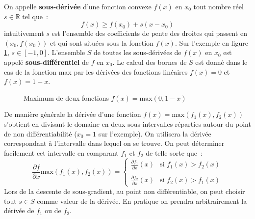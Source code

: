 \documentclass[11pt,openany]{book}
\newcommand{\kw}[1]{{\bf #1}} %
\begin{document}
On appelle \kw{sous-dérivée} d'une fonction convexe $f(x)$ en $x_0$
tout nombre réel $s\in\mathbb{R}$ tel que~:
\begin{displaymath}
f(x) \geq f(x_0) + s(x-x_0)
\end{displaymath}
intuitivement $s$ est l'ensemble des coefficients de pente des droites
qui passent en $(x_0,f(x_0))$ et qui sont situées sous la fonction
$f(x)$. Sur l'exemple en figure \ref{fig-maxfun}, $s\in [-1,0]$.
L'ensemble $S$ de toutes les sous-dérivées de $f(x)$ en $x_0$ est appelé
\kw{sous-différentiel} de $f$ en $x_0$.  Le calcul des bornes de $S$ est donné dans le cas de la fonction max
par les dérivées des fonctions linéaires $f(x) = 0$ et $f(x) =
1-x$. 
\begin{figure}[htbp]
\begin{center}
\end{center}
\caption{\label{fig-maxfun}Maximum de deux fonctions $f(x) = \text{max}(0,1-x)$}
\end{figure}

De manière générale la dérivée d'une fonction $f(x) = \text{max}(f_1(x),f_2(x))$
s'obtient en divisant le domaine en deux sous-intervalles réparties autour du point de non
différentiabilité ($x_0=1$ sur l'exemple). On utilisera la dérivée
correspondant à l'intervalle dans lequel on se trouve.
On peut déterminer facilement cet intervalle en comparant $f_1$ et $f_2$ de telle
sorte que~:
\begin{displaymath}
\frac{\partial f}{\partial x}\text{max}(f_1(x),f_2(x)) = \left\{
\begin{array}{ll}
\frac{\partial f_1}{\partial x}(x) & \text{si } f_1(x) > f_2(x)\\\\
\frac{\partial f_2}{\partial x}(x) & \text{si } f_2(x) > f_1(x)
\end{array}\right.
\end{displaymath}
Lors de la descente de sous-gradient, au point non différentiable, on
peut choisir tout $s\in S$ comme valeur de la dérivée. En pratique on
prendra arbitrairement la dérivée de $f_1$ ou de $f_2$. 
\end{document}
